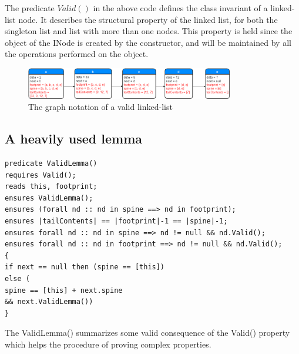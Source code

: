 The predicate $Valid()$ in the above code defines the class invariant of a linked-list node. It describes the structural property of the linked list, for both the singleton list and list with more than one nodes. This property is held since the object of the INode is created by the constructor, and will be maintained by all the operations performed on the object.

\begin{figure}[htbp]
\centering
\includegraphics[width=0.81\textwidth]{./Diagrams/ValidLinkedList}
\caption{The graph notation of a valid linked-list}
\label{fig:ValidLinkedList}
\end{figure}

\subsection*{A heavily used lemma}

\begin{lstlisting}
predicate ValidLemma()
requires Valid();
reads this, footprint;
ensures ValidLemma();
ensures (forall nd :: nd in spine ==> nd in footprint);
ensures |tailContents| == |footprint|-1 == |spine|-1;
ensures forall nd :: nd in spine ==> nd != null && nd.Valid();
ensures forall nd :: nd in footprint ==> nd != null && nd.Valid();
{
if next == null then (spine == [this])
else (
spine == [this] + next.spine 
&& next.ValidLemma())
}

\end{lstlisting}

The ValidLemma() summarizes some valid consequence of the Valid() property which helps the procedure of proving complex properties. 

